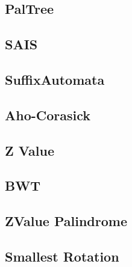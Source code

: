 \documentclass[a4paper,10pt,twocolumn,oneside]{article}
\begin{document}
\subsection{PalTree}


%

\subsection{SAIS}


\subsection{SuffixAutomata}


\subsection{Aho-Corasick}


\subsection{Z Value}


\subsection{BWT}


\subsection{ZValue Palindrome}


\subsection{Smallest Rotation}


%
\end{document}
